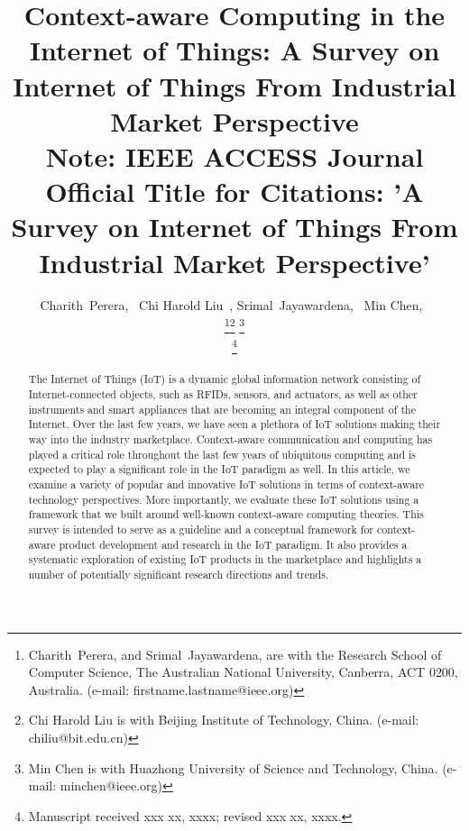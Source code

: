 \documentclass[journal]{IEEEtran}
\begin{document}
\title{Context-aware Computing in the Internet of Things: A Survey on Internet of Things From Industrial Market Perspective\\ {\small Note: IEEE ACCESS Journal Official Title for Citations: 'A Survey on Internet of Things From Industrial Market Perspective'}}





\author{Charith~Perera,~     
        Chi Harold Liu~,
        Srimal~Jayawardena,~   
        Min Chen,~ 



\thanks{Charith~Perera, and Srimal~Jayawardena,  are with the Research School of Computer Science, The Australian National University, Canberra, ACT 0200, Australia. (e-mail: firstname.lastname@ieee.org)}\thanks{Chi Harold  Liu is with Beijing Institute of Technology, China. (e-mail: chiliu@bit.edu.cn)}
\thanks{Min Chen is with Huazhong University of Science and Technology, China. (e-mail: minchen@ieee.org)}

\thanks{Manuscript received xxx xx, xxxx; revised xxx xx, xxxx.}}






















\maketitle


\begin{abstract}
The Internet of Things (IoT) is a dynamic global information network consisting of Internet-connected objects, such as RFIDs, sensors, and actuators, as well as other instruments and smart appliances that are becoming an integral component of the Internet. Over the last few years, we have seen a plethora of IoT solutions making their way into the industry marketplace. Context-aware communication and computing has played a critical role throughout the last few years of ubiquitous computing and is expected to play a significant role in the IoT paradigm as well. In this article, we examine a variety of popular and innovative IoT solutions in terms of context-aware technology perspectives. More importantly, we evaluate these IoT solutions using a framework that we built around well-known context-aware computing theories.  This survey is intended to serve as a guideline and a conceptual framework for context-aware product development and research in the IoT paradigm. It also provides a systematic exploration of existing IoT products in the marketplace and highlights  a number of potentially significant research directions and trends.
\end{abstract}
\end{document}

